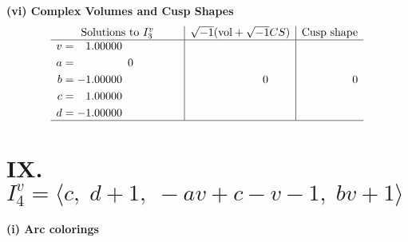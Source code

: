 \documentclass[1p]{elsarticle_modified}
\theoremstyle{definition}
\newcommand{\I}{\sqrt{-1}}
\begin{document}
\newpage\flushleft \textbf{(vi) Complex Volumes and Cusp Shapes}
$$\begin{array}{c|c|c}  
\text{Solutions to }I^v_{3}& \I (\text{vol} + \sqrt{-1}CS) & \text{Cusp shape}\\
 \hline 
\begin{aligned}
v &= \phantom{-}1.00000\phantom{ +0.000000I} \\
a &= \phantom{-0.000000 } 0 \\
b &= -1.00000\phantom{ +0.000000I} \\
c &= \phantom{-}1.00000\phantom{ +0.000000I} \\
d &= -1.00000\phantom{ +0.000000I}\end{aligned}
 & \phantom{-0.000000 } 0 & \phantom{-0.000000 } 0\\
 \hline 
 \end{array}$$\newpage\newpage\renewcommand{\arraystretch}{1}
\centering \section*{IX. $I^v_{4}= \langle c,\;d+1,\;- a v+c- v-1,\;b v+1 \rangle$}
\flushleft \textbf{(i) Arc colorings}\\
\end{document}
